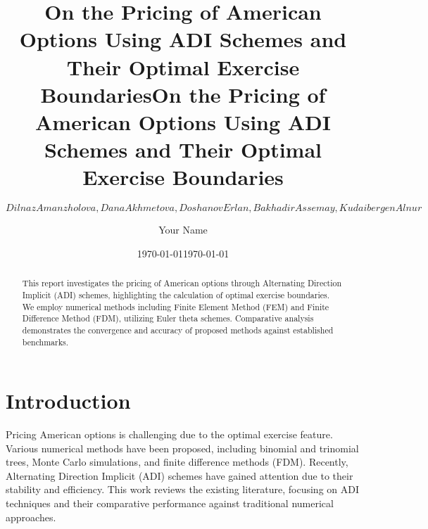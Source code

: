 \documentclass{article}
\title{On the Pricing of American Options Using ADI Schemes and Their Optimal Exercise Boundaries}
\author{\[Dilnaz Amanzholova,Dana Akhmetova,Doshanov Erlan,Bakhadir Assemay,Kudaibergen Alnur\]}
\date{\today}
\begin{document}
\maketitle

\begin{abstract}
This report investigates the pricing of American options through Alternating Direction Implicit (ADI) schemes, highlighting the calculation of optimal exercise boundaries. We employ numerical methods including Finite Element Method (FEM) and Finite Difference Method (FDM), utilizing Euler theta schemes. Comparative analysis demonstrates the convergence and accuracy of proposed methods against established benchmarks.
\end{abstract}

\section{Introduction}
Pricing American options is challenging due to the optimal exercise feature. Various numerical methods have been proposed, including binomial and trinomial trees, Monte Carlo simulations, and finite difference methods (FDM). Recently, Alternating Direction Implicit (ADI) schemes have gained attention due to their stability and efficiency. This work reviews the existing literature, focusing on ADI techniques and their comparative performance against traditional numerical approaches.



\usepackage{times}
\usepackage{mathptmx}

\theoremstyle{plain}
\newtheorem{theorem}{Theorem}
\newtheorem{lemma}{Lemma}
\theoremstyle{definition}
\newtheorem{remark}{Remark}

\title{On the Pricing of American Options Using ADI Schemes and Their Optimal Exercise Boundaries}
\author{Your Name}
\date{\today}



\maketitle
\end{document}
